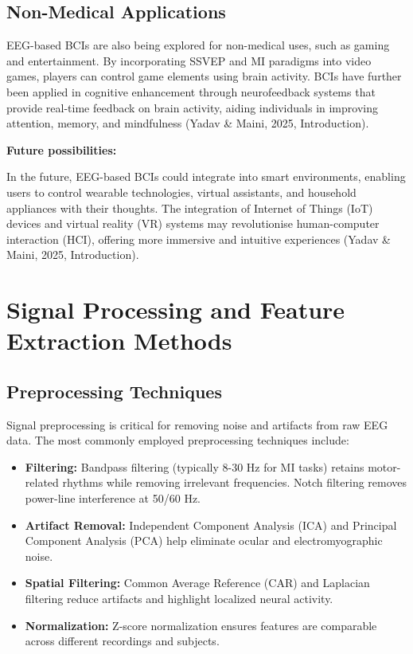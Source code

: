 \documentclass[12pt]{article}
\begin{document}
\subsection{Non-Medical Applications}

EEG-based BCIs are also being explored for non-medical uses, such as gaming and entertainment. By incorporating SSVEP and MI paradigms into video games, players can control game elements using brain activity. BCIs have further been applied in cognitive enhancement through neurofeedback systems that provide real-time feedback on brain activity, aiding individuals in improving attention, memory, and mindfulness (Yadav \& Maini, 2025, Introduction).

\textbf{Future possibilities:}

In the future, EEG-based BCIs could integrate into smart environments, enabling users to control wearable technologies, virtual assistants, and household appliances with their thoughts. The integration of Internet of Things (IoT) devices and virtual reality (VR) systems may revolutionise human-computer interaction (HCI), offering more immersive and intuitive experiences (Yadav \& Maini, 2025, Introduction).

\section{Signal Processing and Feature Extraction Methods}

\subsection{Preprocessing Techniques}

Signal preprocessing is critical for removing noise and artifacts from raw EEG data. The most commonly employed preprocessing techniques include:

\begin{itemize}
    \item \textbf{Filtering:} Bandpass filtering (typically 8-30 Hz for MI tasks) retains motor-related rhythms while removing irrelevant frequencies. Notch filtering removes power-line interference at 50/60 Hz.
    \item \textbf{Artifact Removal:} Independent Component Analysis (ICA) and Principal Component Analysis (PCA) help eliminate ocular and electromyographic noise.
    \item \textbf{Spatial Filtering:} Common Average Reference (CAR) and Laplacian filtering reduce artifacts and highlight localized neural activity.
    \item \textbf{Normalization:} Z-score normalization ensures features are comparable across different recordings and subjects.
\end{itemize}
\end{document}
